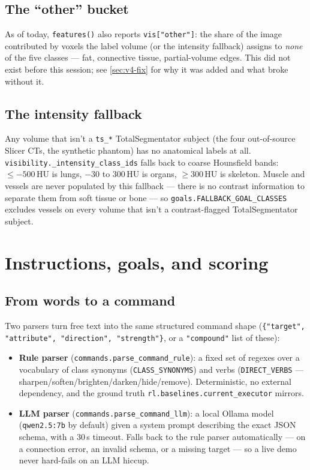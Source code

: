 \documentclass[10pt]{article}
\newcommand{\code}[1]{\texttt{#1}}
\begin{document}
\subsection{The ``other'' bucket}
\label{sec:other-bucket}

As of today, \code{features()} also reports \code{vis["other"]}: the share of
the image contributed by voxels the label volume (or the intensity fallback)
assigns to \emph{none} of the five classes --- fat, connective tissue,
partial-volume edges. This did not exist before this session; see
\cref{sec:v4-fix} for why it was added and what broke without it.

\subsection{The intensity fallback}
\label{sec:intensity-fallback}

Any volume that isn't a \code{ts\_*} TotalSegmentator subject (the four
out-of-source Slicer CTs, the synthetic phantom) has no anatomical labels at
all. \code{visibility.\_intensity\_class\_ids} falls back to coarse
Hounsfield bands: $\le -500$\,HU is lungs, $-30$ to $300$\,HU is organs,
$\ge 300$\,HU is skeleton. Muscle and vessels are never populated by this
fallback --- there is no contrast information to separate them from soft
tissue or bone --- so \code{goals.FALLBACK\_GOAL\_CLASSES} excludes vessels
on every volume that isn't a contrast-flagged TotalSegmentator subject.

\newpage
\section{Instructions, goals, and scoring}

\subsection{From words to a command}

Two parsers turn free text into the same structured command shape
(\code{\{"target", "attribute", "direction", "strength"\}}, or a
\code{"compound"} list of these):

\begin{itemize}[itemsep=2pt, topsep=2pt]
\item \textbf{Rule parser} (\code{commands.parse\_command\_rule}): a fixed
  set of regexes over a vocabulary of class synonyms (\code{CLASS\_SYNONYMS})
  and verbs (\code{DIRECT\_VERBS} --- sharpen/soften/brighten/darken/hide/remove).
  Deterministic, no external dependency, and the ground truth
  \code{rl.baselines.current\_executor} mirrors.
\item \textbf{LLM parser} (\code{commands.parse\_command\_llm}): a local
  Ollama model (\code{qwen2.5:7b} by default) given a system prompt
  describing the exact JSON schema, with a 30\,s timeout. Falls back to the
  rule parser automatically --- on a connection error, an invalid schema, or
  a missing target --- so a live demo never hard-fails on an LLM hiccup.
\end{itemize}
\end{document}
